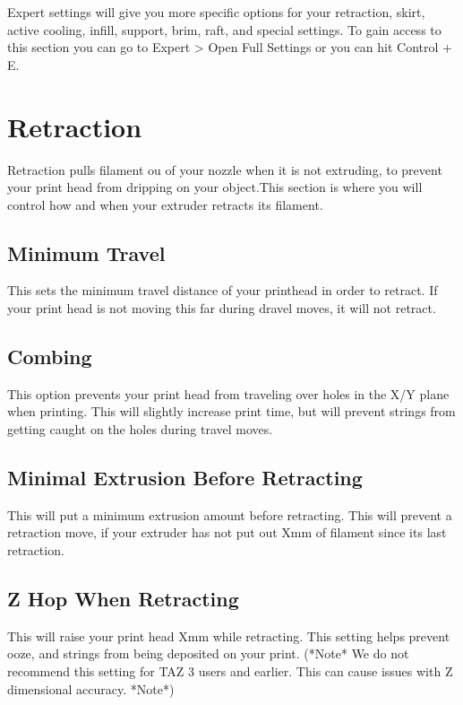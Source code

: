 Expert settings will give you more specific options for your retraction, skirt, active cooling, infill, support, brim, raft, and special settings. To gain access to this section you can go to Expert > Open Full Settings or you can hit Control + E.

\section{Retraction}

Retraction pulls filament ou of your nozzle when it is not extruding, to prevent your print head from dripping on your object.This section is where you will control how and when your extruder retracts its filament.

\subsection{Minimum Travel}

This sets the minimum travel distance of your printhead in order to retract. If your print head is not moving this far during dravel moves, it will not 	retract.

\subsection{Combing}

This option prevents your print head from traveling over holes in the X/Y plane when printing. This will slightly increase print time, but will prevent strings from getting caught on the holes during travel moves.

\subsection{Minimal Extrusion Before Retracting}

This will put a minimum extrusion amount before retracting. This will prevent a retraction move, if your extruder has not put out Xmm of filament since its last retraction.

\subsection{Z Hop When Retracting}

This will raise your print head Xmm while retracting. This setting helps prevent ooze, and strings from being deposited on your print. (*Note* We do not recommend this setting for TAZ 3 users and earlier. This can cause issues with Z dimensional accuracy. *Note*)

